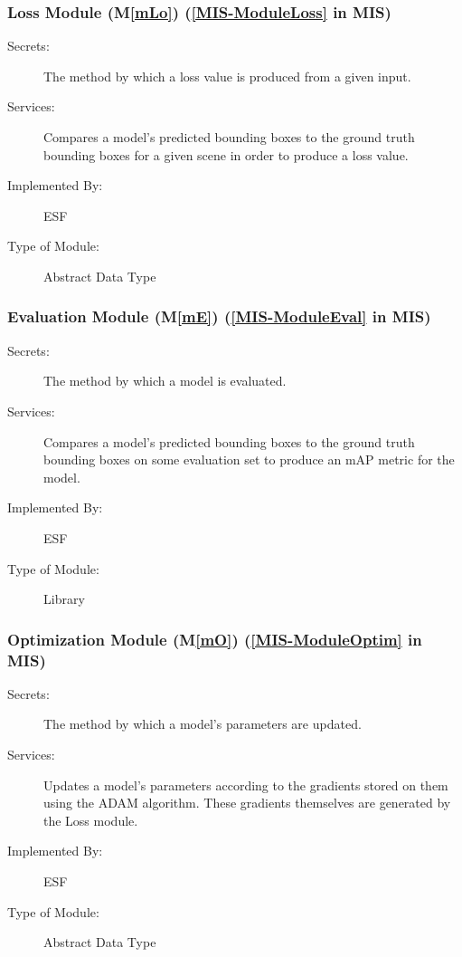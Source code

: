 \documentclass[12pt, titlepage]{article}
\newcommand{\ProjectName}{ESF }
\newcommand{\mref}[1]{M\ref{#1}}
\begin{document}
\subsubsection{Loss Module (\mref{mLo}) (\ref{MIS-ModuleLoss} in MIS)}
\begin{description}
\item[Secrets:] The method by which a loss value is produced from a given input.
\item[Services:] Compares a model's predicted bounding boxes to the ground truth bounding boxes for a given scene in order to produce a loss value.
\item[Implemented By:] \ProjectName{}
\item[Type of Module:] Abstract Data Type
\end{description}

\subsubsection{Evaluation Module (\mref{mE}) (\ref{MIS-ModuleEval} in MIS)}
\begin{description}
\item[Secrets:] The method by which a model is evaluated. 
\item[Services:] Compares a model's predicted bounding boxes to the ground truth bounding boxes on some evaluation set to produce an mAP metric for the model.
\item[Implemented By:] \ProjectName{}
\item[Type of Module:] Library
\end{description}

\subsubsection{Optimization Module (\mref{mO}) (\ref{MIS-ModuleOptim} in MIS)}
\begin{description}
\item[Secrets:] The method by which a model's parameters are updated.
\item[Services:] Updates a model's parameters according to the gradients stored on them using the ADAM algorithm. These gradients themselves are generated by the Loss module.
\item[Implemented By:] \ProjectName{}
\item[Type of Module:] Abstract Data Type
\end{description}
\end{document}
